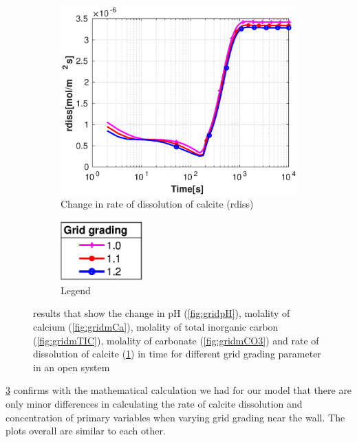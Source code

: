 \begin{figure}[!h]
        \hfill
        \begin{subfigure}{.5\linewidth}
            \centering
        \includegraphics[width=\textwidth]{PICTURES/with_grid_rdiss.eps}
        \caption{Change in rate of dissolution of calcite (rdiss)}
        \label{fig:gridrdiss}
    \end{subfigure}%
        \hfill
        \begin{subfigure}{.5\linewidth}
            \centering
        \includegraphics[width=0.35\textwidth]{PICTURES/with_grid_legend.eps}
        \caption{Legend}
        \label{fig:gridlegend}
    \end{subfigure}%
    \caption{\DuMuX results that show the change in pH (\cref{fig:gridpH}), molality of calcium (\cref{fig:gridmCa}), 
    molality of total inorganic carbon (\cref{fig:gridmTIC}), molality of carbonate (\cref{fig:gridmCO3}) 
    and rate of dissolution of calcite (\cref{fig:gridrdiss}) in time for different grid grading parameter in an open system}
    \label{fig:diffGrid}
\end{figure}

\cref{fig:diffGrid} confirms with the mathematical calculation we had for our model that there are only minor differences 
in calculating the rate of calcite dissolution and concentration of primary variables when varying grid grading near the wall. 
The plots overall are similar to each other. 

